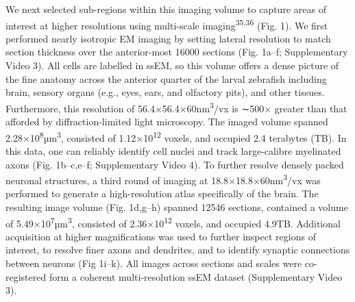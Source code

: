 \documentclass{article}
\begin{document}
We next selected sub-regions within this imaging volume to capture areas of interest at higher resolutions using multi-scale imaging\textsuperscript{35,36} (Fig. 1). We first performed nearly isotropic EM imaging by setting lateral resolution to match section thickness over the anterior-most 16000 sections (Fig. 1a–f; Supplementary Video 3). All cells are labelled in ssEM, so this volume offers a dense picture of the fine anatomy across the anterior quarter of the larval zebrafish including brain, sensory organs (e.g., eyes, ears, and olfactory pits), and other tissues. Furthermore, this resolution of 56.4×56.4×60nm\textsuperscript{3}/vx is ∼500× greater than that afforded by diffraction-limited light microscopy. The imaged volume spanned 2.28×10\textsuperscript{8}µm\textsuperscript{3}, consisted of 1.12×10\textsuperscript{12} voxels, and
occupied 2.4 terabytes (TB). In this data, one can reliably identify cell nuclei and track large-calibre myelinated axons (Fig. 1b–c,e–f; Supplementary Video 4). To further resolve densely packed neuronal structures, a third round of imaging at 18.8×18.8×60nm\textsuperscript{3}/vx was performed to generate a high-resolution atlas specifically of the brain. The resulting image volume (Fig. 1d,g–h) spanned 12546 sections, contained a volume of 5.49×10\textsuperscript{7}µm\textsuperscript{3}, consisted of 2.36×10\textsuperscript{12} voxels, and occupied 4.9TB. Additional acquisition at higher magnifications was used to further inspect regions of interest, to resolve finer axons and dendrites, and to identify synaptic connections between neurons (Fig 1i–k). All images across sections and scales were co-registered form a coherent multi-resolution ssEM dataset (Supplementary Video 3).
\end{document}
